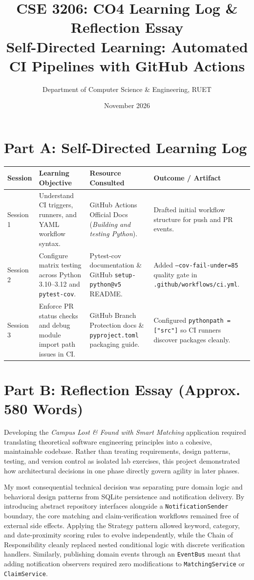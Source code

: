 \documentclass[12pt,a4paper]{article}
\title{\textbf{CSE 3206: CO4 Learning Log \& Reflection Essay}\\
Self-Directed Learning: Automated CI Pipelines with GitHub Actions}
\author{Department of Computer Science \& Engineering, RUET}
\date{November 2026}
\begin{document}
\maketitle

\section*{Part A: Self-Directed Learning Log}
\begin{table}[h!]
\centering
\small
\begin{tabular}{p{2.2cm}p{4.2cm}p{4.2cm}p{3.6cm}}
\toprule
\textbf{Session} & \textbf{Learning Objective} & \textbf{Resource Consulted} & \textbf{Outcome / Artifact} \\
\midrule
Session 1 & Understand CI triggers, runners, and YAML workflow syntax. & GitHub Actions Official Docs (\textit{Building and testing Python}). & Drafted initial workflow structure for push and PR events. \\
Session 2 & Configure matrix testing across Python 3.10--3.12 and \texttt{pytest-cov}. & Pytest-cov documentation \& GitHub \texttt{setup-python@v5} README. & Added \texttt{--cov-fail-under=85} quality gate in \texttt{.github/workflows/ci.yml}. \\
Session 3 & Enforce PR status checks and debug module import path issues in CI. & GitHub Branch Protection docs \& \texttt{pyproject.toml} packaging guide. & Configured \texttt{pythonpath = ["src"]} so CI runners discover packages cleanly. \\
\bottomrule
\end{tabular}
\end{table}

\section*{Part B: Reflection Essay (Approx. 580 Words)}

Developing the \textit{Campus Lost \& Found with Smart Matching} application required translating theoretical software engineering principles into a cohesive, maintainable codebase. Rather than treating requirements, design patterns, testing, and version control as isolated lab exercises, this project demonstrated how architectural decisions in one phase directly govern agility in later phases.

My most consequential technical decision was separating pure domain logic and behavioral design patterns from SQLite persistence and notification delivery. By introducing abstract repository interfaces alongside a \texttt{NotificationSender} boundary, the core matching and claim-verification workflows remained free of external side effects. Applying the Strategy pattern allowed keyword, category, and date-proximity scoring rules to evolve independently, while the Chain of Responsibility cleanly replaced nested conditional logic with discrete verification handlers. Similarly, publishing domain events through an \texttt{EventBus} meant that adding notification observers required zero modifications to \texttt{MatchingService} or \texttt{ClaimService}.
\end{document}
